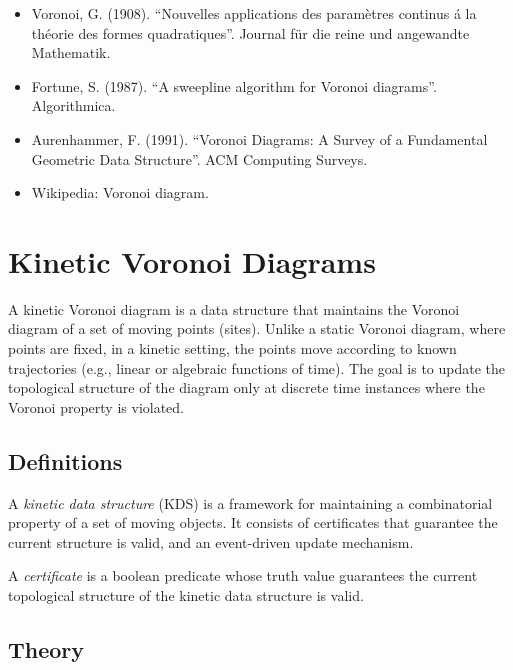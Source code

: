 \begin{itemize}
\item Voronoi, G. (1908). ``Nouvelles applications des param\`{e}tres continus \'{a} la th\'{e}orie des formes quadratiques''. Journal f\"{u}r die reine und angewandte Mathematik.
\item Fortune, S. (1987). ``A sweepline algorithm for Voronoi diagrams''. Algorithmica.
\item Aurenhammer, F. (1991). ``Voronoi Diagrams: A Survey of a Fundamental Geometric Data Structure''. ACM Computing Surveys.
\item Wikipedia: Voronoi diagram.
\end{itemize}


\section{Kinetic Voronoi Diagrams}
\label{sec:kinetic_voronoi}

A kinetic Voronoi diagram is a data structure that maintains the Voronoi diagram of a set of moving points (sites). Unlike a static Voronoi diagram, where points are fixed, in a kinetic setting, the points move according to known trajectories (e.g., linear or algebraic functions of time). The goal is to update the topological structure of the diagram only at discrete time instances where the Voronoi property is violated.

\subsection{Definitions}

\begin{definition}\label{def:kds}
A \emph{kinetic data structure} (KDS) is a framework for maintaining a combinatorial property of a set of moving objects. It consists of certificates that guarantee the current structure is valid, and an event-driven update mechanism.
\end{definition}

\begin{definition}[Certificate]\label{def:certificate}
A \emph{certificate} is a boolean predicate whose truth value guarantees the current topological structure of the kinetic data structure is valid.
\end{definition}

\subsection{Theory}

